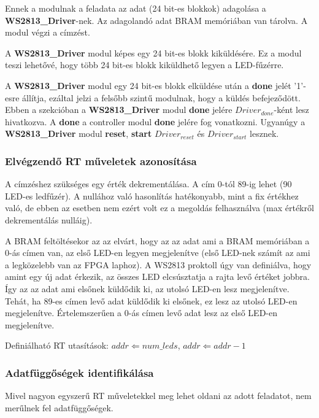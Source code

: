 \tab Ennek a modulnak a feladata az adat (24 bit-es blokkok) adagolása a \textbf{WS2813\_Driver}-nek. Az adagolandó adat BRAM memóriában van tárolva. A modul végzi a címzést.

\tab A \textbf{WS2813\_Driver} modul képes egy 24 bit-es blokk kiküldésére. Ez a modul teszi lehetővé, hogy több 24 bit-es blokk kiküldhető legyen a LED-fűzérre.

\tab A \textbf{WS2813\_Driver} modul egy 24 bit-es blokk elküldése után a \textbf{done} jelét '1'-esre állítja, ezáltal jelzi a felsőbb szintű modulnak, hogy a küldés befejeződött.
Ebben a szekcióban a \textbf{WS2813\_Driver} modul \textbf{done} jelére $Driver_{done}$-ként lesz hivatkozva. A \textbf{done} a controller modul \textbf{done} jelére fog vonatkozni.
Ugyanúgy a \textbf{WS2813\_Driver} modul \textbf{reset}, \textbf{start} $Driver_{reset}$ és $Driver_{start}$ lesznek.

\subsubsection{Elvégzendő RT műveletek azonosítása}

\tab A címzéshez szükséges egy érték dekrementálása. A cím 0-tól 89-ig lehet (90 LED-es ledfűzér). A nullához való hasonlítás hatékonyabb, mint a fix értékhez való,
de ebben az esetben nem ezért volt ez a megoldás felhasználva (max értékről dekrementálás nulláig). 

\tab A BRAM feltöltésekor az az elvárt, hogy az az adat ami a BRAM memóriában a 0-ás címen van, az első LED-en legyen megjelenítve
(első LED-nek számít az ami a legközelebb van az FPGA laphoz). A WS2813 proktoll úgy van definiálva, hogy amint egy új adat érkezik, az összes LED elcsúsztatja a rajta levő értéket jobbra.
Így az az adat ami elsőnek küldődik ki, az utolsó LED-en lesz megjelenítve. Tehát, ha 89-es címen levő adat küldődik ki elsőnek, ez lesz az utolsó LED-en megjelenítve. Értelemszerűen a 0-ás címen
levő adat lesz az első LED-en megjelenítve.

\tab Definiálható RT utasítások: $addr \Leftarrow num\_{leds}$, $addr \Leftarrow addr - 1$

\subsubsection{Adatfüggőségek identifikálása}

\tab Mivel nagyon egyszerű RT műveletekkel meg lehet oldani az adott feladatot, nem merűlnek fel adatfüggőségek.

